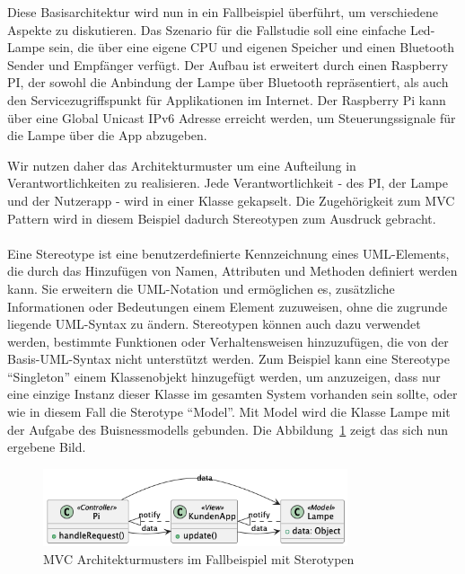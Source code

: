\documentclass[../vs-script-first-v01.tex]{subfiles}
\begin{document}
Diese Basisarchitektur wird nun in ein Fallbeispiel überführt, um verschiedene Aspekte zu diskutieren. Das Szenario für die Fallstudie soll eine einfache Led-Lampe sein, die über eine eigene CPU und eigenen Speicher und einen Bluetooth Sender und Empfänger verfügt. Der Aufbau ist erweitert durch einen Raspberry PI, der sowohl die Anbindung der Lampe über Bluetooth repräsentiert, als auch den Servicezugriffspunkt für Applikationen im Internet. Der Raspberry Pi kann über eine Global Unicast IPv6 Adresse erreicht werden, um Steuerungssignale für die Lampe über die App abzugeben. 

Wir nutzen daher das Architekturmuster um eine Aufteilung in Verantwortlichkeiten zu realisieren. Jede Verantwortlichkeit - des PI, der Lampe und der Nutzerapp - wird in einer Klasse gekapselt. Die Zugehörigkeit zum MVC Pattern wird in diesem Beispiel dadurch Stereotypen zum Ausdruck gebracht.
\\\\
Eine Stereotype ist eine benutzerdefinierte Kennzeichnung eines UML-Elements, die durch das Hinzufügen von Namen, Attributen und Methoden definiert werden kann. Sie erweitern die UML-Notation und ermöglichen es, zusätzliche Informationen oder Bedeutungen einem Element zuzuweisen, ohne die zugrunde liegende UML-Syntax zu ändern. Stereotypen können auch dazu verwendet werden, bestimmte Funktionen oder Verhaltensweisen hinzuzufügen, die von der Basis-UML-Syntax nicht unterstützt werden. Zum Beispiel kann eine Stereotype \enquote{Singleton} einem Klassenobjekt hinzugefügt werden, um anzuzeigen, dass nur eine einzige Instanz dieser Klasse im gesamten System vorhanden sein sollte, oder wie in diesem Fall die Sterotype  \enquote{Model}. Mit Model wird die Klasse Lampe mit der Aufgabe des Buisnessmodells gebunden. 
Die Abbildung~\ref{fig:stereo-mvc} zeigt das sich nun ergebene Bild. 
\begin{figure}[ht]
  \centering
  \includegraphics[width=0.8\textwidth]{fig/uml/sterotypen-mvc.png}
  \caption{MVC Architekturmusters im Fallbeispiel mit Sterotypen}
  \label{fig:stereo-mvc}
\end{figure}
\end{document}
